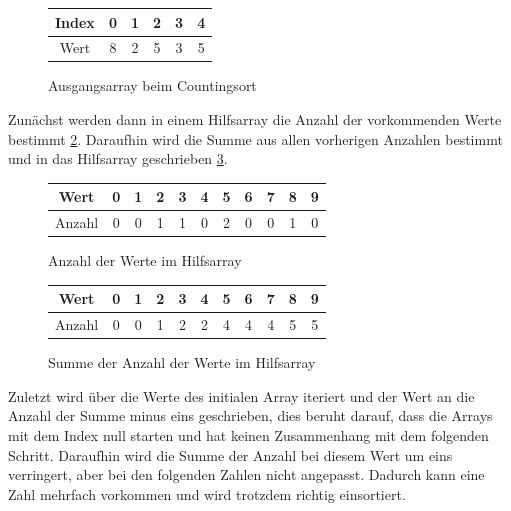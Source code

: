\documentclass[intern,palatino]{cgBA}
\begin{document}
\begin{figure}[H]
	\centering
	\begin{tabular}{ | c || c | c | c | c | c |}
		\hline
		Index 				&  0 & 1 & 2 & 3 & 4 \\ \hline
		Wert				&  8 & 2 & 5 & 3 & 5 \\
		\hline
	\end{tabular}
	\caption{Ausgangsarray beim Countingsort}
	\label{tab:Counting1}
\end{figure}

Zunächst werden dann in einem Hilfsarray die Anzahl der vorkommenden Werte bestimmt \ref{tab:Counting2}. Daraufhin wird die Summe aus allen vorherigen Anzahlen bestimmt und in das Hilfsarray geschrieben \ref{tab:Counting3}.
\newline

\begin{figure}[H]
	\centering
	\begin{tabular}{ | c || c | c | c | c | c | c | c | c | c | c |}
		\hline
		Wert 				& 0	&  1 & 2 & 3 & 4 & 5 & 6 & 7 & 8 & 9	\\ \hline
		Anzahl				& 0 &  0 & 1 & 1 & 0 & 2 & 0 & 0 & 1 & 0	\\
		\hline
	\end{tabular}
	\caption{Anzahl der Werte im Hilfsarray}
	\label{tab:Counting2}
\end{figure}

\begin{figure}[H]
	\centering
	\begin{tabular}{ | c || c | c | c | c | c | c | c | c | c | c |}
		\hline
		Wert 				& 0	&  1 & 2 & 3 & 4 & 5 & 6 & 7 & 8 & 9	\\ \hline
		Anzahl				& 0 &  0 & 1 & 2 & 2 & 4 & 4 & 4 & 5 & 5	\\
		\hline
	\end{tabular}
	\caption{Summe der Anzahl der Werte im Hilfsarray}
	\label{tab:Counting3}
\end{figure}

Zuletzt wird über die Werte des initialen Array iteriert und der Wert an die Anzahl der Summe minus eins geschrieben, dies beruht darauf, dass die Arrays mit dem Index null starten und hat keinen Zusammenhang mit dem folgenden Schritt. Daraufhin wird die Summe der Anzahl bei diesem Wert um eins verringert, aber bei den folgenden Zahlen nicht angepasst. Dadurch kann eine Zahl mehrfach vorkommen und wird trotzdem richtig einsortiert.
\newline
\end{document}
